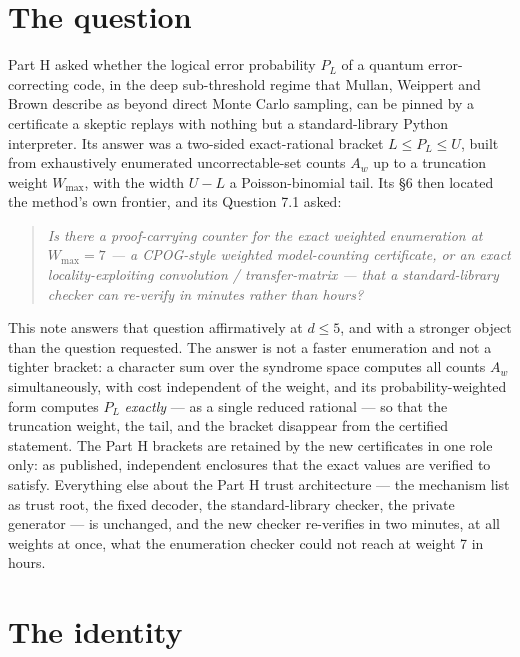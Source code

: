\documentclass[11pt]{amsart}
\newcommand{\PL}{P_{L}}
\theoremstyle{plain}
\theoremstyle{definition}
\theoremstyle{remark}
\begin{document}
\maketitle

\section{The question}\label{sec:question}

Part H \cite{PartH} asked whether the logical error probability $\PL$ of a
quantum error-correcting code, in the deep sub-threshold regime that Mullan,
Weippert and Brown \cite{MWB} describe as beyond direct Monte Carlo sampling,
can be pinned by a certificate a
skeptic replays with nothing but a standard-library Python interpreter. Its
answer was a two-sided exact-rational bracket $L \le \PL \le U$, built from
exhaustively enumerated uncorrectable-set counts $A_w$ up to a truncation
weight $W_{\max}$, with the width $U - L$ a Poisson-binomial tail. Its
\S6 then located the method's own frontier, and its Question 7.1 asked:

\begin{quote}
\emph{Is there a proof-carrying counter for the exact weighted enumeration at
$W_{\max} = 7$ --- a CPOG-style weighted model-counting certificate, or an
exact locality-exploiting convolution / transfer-matrix --- that a
standard-library checker can re-verify in minutes rather than hours?}
\end{quote}

This note answers that question affirmatively at $d \le 5$, and with a
stronger object than the question requested. The answer is not a faster
enumeration and not a tighter bracket: a character sum over the syndrome
space computes all counts $A_w$ simultaneously, with cost independent of the
weight, and its probability-weighted form computes $\PL$ \emph{exactly} ---
as a single reduced rational --- so that the truncation weight, the tail, and
the bracket disappear from the certified statement. The Part H brackets are
retained by the new certificates in one role only: as published, independent
enclosures that the exact values are verified to satisfy. Everything else
about the Part H trust architecture --- the mechanism list as trust root, the
fixed decoder, the standard-library checker, the private generator --- is
unchanged, and the new checker re-verifies in two minutes, at all weights at
once, what the enumeration checker could not reach at weight 7 in hours.

\section{The identity}\label{sec:identity}
\end{document}
